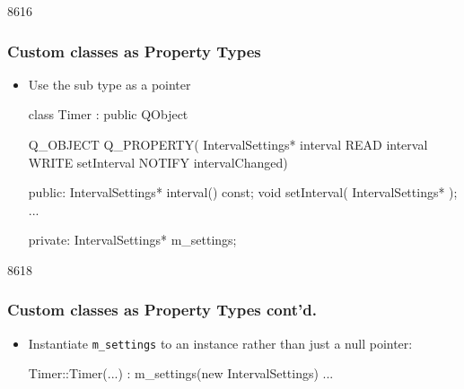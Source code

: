 \begin{slide}[fragile]{8616}\frametitle{Custom classes as Property Types}
  \begin{itemize}
    \item Use the sub type as a pointer\vspace{5mm}
\begin{cpp}
class Timer : public QObject
{
    Q_OBJECT
    Q_PROPERTY( IntervalSettings* interval READ interval 
                WRITE setInterval NOTIFY intervalChanged)

public:
    IntervalSettings* interval() const;
    void setInterval( IntervalSettings* );
    ...

private:
    IntervalSettings* m_settings;
}
\end{cpp}
  \end{itemize}
\end{slide}

\begin{slide}[fragile]{8618}\frametitle{Custom classes as Property Types cont'd.}
  \begin{itemize}
  \item Instantiate \texttt{m\_settings} to an instance rather than just a
    null pointer:\vspace{5mm}
\begin{cpp}
Timer::Timer(...)
    : m_settings(new IntervalSettings)
{
  ...
}
\end{cpp}
  \end{itemize}
\end{slide}

